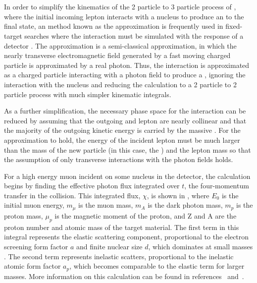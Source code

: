 \section{\ww}
\label{sec:wwApprox}
In order to simplify the kinematics of the 2 particle to 3 particle process of \dbrem, where the initial incoming lepton interacts with a nucleus to produce an \aprime to the final state, an method known as the \ww approximation \cite{vonWeizsacker:1934nji,Williams:1935dka} is frequently used in fixed-target searches where the interaction must be simulated with the response of a detector \cite{Bjorken_2009,Andreas_2012}.
The \ww approximation is a semi-classical approximation, in which the nearly transverse electromagnetic field generated by a fast moving charged particle is approximated by a real photon. 
Thus, the interaction is approximated as a charged particle interacting with a photon field to produce a \aprime, ignoring the interaction with the nucleus and reducing the calculation to a 2 particle to 2 particle process with much simpler kinematic integrals.

As a further simplification, the necessary phase space for the interaction can be reduced by assuming that the outgoing \aprime and lepton are nearly collinear and that the majority of the outgoing kinetic energy is carried by the massive \aprime.
For the approximation to hold, the energy of the incident lepton must be much larger than the mass of the new particle (in this case, the \aprime) and the lepton mass so that the assumption of only transverse interactions with the photon fields holds. 

For a high energy muon incident on some nucleus in the detector, the calculation begins by finding the effective photon flux integrated over $t$, the four-momentum transfer in the collision. 
This integrated flux, $\chi$, is shown in , where $E_0$ is the initial muon energy, $m_\mu$ is the muon mass, $m_A$ is the dark photon mass, $m_p$ is the proton mass, $\mu_p$ is the magnetic moment of the proton, and Z and A are the proton number and atomic mass of the target material.
The first term in this integral represents the  elastic scattering component, proportional to the electron screening form factor $a$ and finite nuclear size $d$, which dominates at small \aprime masses .
The second term represents inelastic scatters, proportional to the inelastic atomic form factor $a_p$, which becomes comparable to the elastic term for larger \aprime masses.
More information on this calculation can be found in references~\cite{kim_1973} and~\cite{tsai_1974}. 

